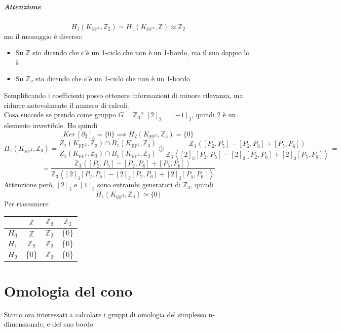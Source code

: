 \documentclass[a4paper]{report}
\newcommand{\Z}{\ensuremath{\mathbb{Z}}}
\newcommand{\KRP}[1]{\ensuremath{K_{\mathbb{RP}^{#1}}}}
\newcommand{\gen}[1]{\ensuremath{\left<{#1}\right>}}
\begin{document}
\paragraph{Attenzione}
\[
    H_1(\KRP{2},\Z_2)=H_1(\KRP{2},\Z)\simeq\Z_2
\]
ma il messaggio è diverso:
\begin{itemize}
    \item Su $\Z$ sto dicendo che c'è un 1-ciclo che non è un 1-bordo, ma il suo doppio lo è
    \item Su $\Z_2$ sto dicendo che c'è un 1-ciclo che non è un 1-bordo
\end{itemize}
Semplificando i coefficienti posso ottenere informazioni di minore rilevanza, ma ridurre notevolmente il numero di calcoli.\\
Cosa succede se prendo come gruppo $G=\Z_3$? $[2]_3=[-1]_3$, quindi $2$ è un elemento invertibile. Ho quindi
\[
    Ker\ [\partial_2]_3=\{0\}\implies H_2(\KRP{2},\Z_3)=\{0\}
\]
\[
    H_1(\KRP{2},\Z_3)=\frac{Z_1(\KRP{2},\Z_3)\cap B_1(\KRP{2},\Z_3)}{Z_1(\KRP{2},\Z_3)\cap B_1(\KRP{2},\Z_3)}\oplus\frac{\Z_3\gen{[P_2,P_5]-[P_2,P_6]+[P_5,P_6]}}{\Z_3\gen{[2]_3[P_2,P_5]-[2]_3[P_2,P_6]+[2]_3[P_5,P_6]}}=
\]
\[
    =\frac{\Z_3\gen{[P_2,P_5]-[P_2,P_6]+[P_5,P_6]}}{\Z_3\gen{[2]_3[P_2,P_5]-[2]_3[P_2,P_6]+[2]_3[P_5,P_6]}}
\]
Attenzione però, $[2]_3$ e $[1]_3$ sono entrambi generatori di $\Z_3$, quindi
\[
    H_1(\KRP{2},\Z_3)\simeq\{0\}
\]
Per riassumere
\begin{center}
    \begin{tabular}{|c|c|c|c|}
        \hline
              & $\Z$    & $\Z_2$ & $\Z_3$  \\ \hline
        $H_0$ & $\Z$    & $\Z_2$ & $\{0\}$ \\ \hline
        $H_1$ & $\Z_2$  & $\Z_2$ & $\{0\}$ \\ \hline
        $H_2$ & $\{0\}$ & $\Z_2$ & $\{0\}$ \\ \hline
    \end{tabular}
\end{center}
\chapter{Omologia del cono}
Siamo ora interessati a calcolare i gruppi di omologia del simplesso n-dimensionale, e del suo bordo
\end{document}

